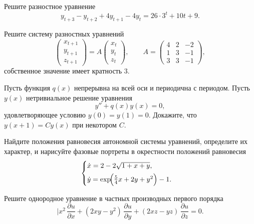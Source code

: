 \documentclass[12pt]{article}
\newcommand{\VariantTitle}{Вариант А}
\begin{document}
\ExamVariantTitle{\VariantTitle}


\begin{examproblems}

\item Решите разностное уравнение
\[
y_{t+3}-y_{t+2}+4y_{t+1}-4y_{t} = 26 \cdot 3^{t} + 10t + 9.
\]

\item Решите систему разностных уравнений
\[
\begin{pmatrix}
x_{t+1}\\[2pt]
y_{t+1}\\[2pt]
z_{t+1}
\end{pmatrix}
=
A
\begin{pmatrix}
x_{t}\\[2pt]
y_{t}\\[2pt]
z_{t}
\end{pmatrix},
\qquad
A=
\begin{pmatrix}
4 & 2 & -2\\
1 & 3 & -1\\
3 & 3 & -1
\end{pmatrix},
\]
собственное значение имеет кратность $3$.

\item Пусть функция $q(x)$ непрерывна на всей оси и периодична с периодом. Пусть $y(x)$ нетривиальное решение уравнения
\[
y'' + q(x)y(x)=0,
\]
удовлетворяющее условию $y(0)=y(1)=0$. Докажите, что $y(x+1)=Cy(x)$ при некотором $C$.

\item Найдите положения равновесия автономной системы уравнений, определите их характер, и нарисуйте фазовые портреты в окрестности положений равновесия
\[
\begin{cases}
\dot{x}=2-2\sqrt{1+x+y},\\[4pt]
\dot{y}=\exp\!\Bigl(\tfrac{5}{4}x+2y+y^{2}\Bigr)-1.
\end{cases}
\]

\item Решите однородное уравнение в частных производных первого порядка
\[
|x^{2}\,\frac{\partial u}{\partial x}
+(2xy-y^{2})\,\frac{\partial u}{\partial y}
+(2xz-yz)\,\frac{\partial u}{\partial z}=0.
\]

\end{examproblems}
\end{document}

